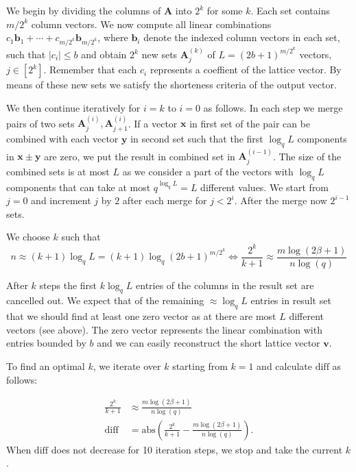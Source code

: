 We begin by dividing the columns of $\mathbf{A}$ into $2^k$ for some $k$. Each set contains $m/2^k$ column vectors. We now compute all linear combinations $c_1 \mathbf{b}_1 + \cdots + c_{m/2^k}\mathbf{b}_{m/2^k}$, where $\mathbf{b}_i$ denote the indexed column vectors in each set, such that $|c_i| \leq b$ and obtain $2^k$ new sets $\mathbf{A}_j^{(k)}$ of $L=(2b+1)^{m/2^k}$ vectors, $j\in \left[2^k\right]$. Remember that each $c_i$ represents a coeffient of the lattice vector. By means of these new sets we satisfy the shorteness criteria of the output vector.

We then continue iteratively for $i=k$ to $i=0$ as follows. In each step we merge pairs of two sets $\mathbf{A}_j^{(i)}, \mathbf{A}_{j+1}^{(i)}$. If a vector $\mathbf{x}$ in first set of the pair can be combined with each vector $\mathbf{y}$ in second set such that the first $\log_q L$ components in $\mathbf{x} \pm \mathbf{y}$ are zero, we put the result in combined set in $\mathbf{A}_j^{(i-1)}$. The size of the combined sets is at most $L$ as we consider a part of the vectors with $\log_q L$ components that can take at most $q^{\log_q L} = L$ different values. We start from $j=0$ and increment $j$ by $2$ after each merge for $j<2^i$.
After the merge now $2^{i-1}$ sets.

We choose $k$ such that
\begin{equation}
  n \approx (k+1) \log_q L = (k+1) \log_q (2b+1)^{m/2^k} \iff \frac{2^k}{k+1} \approx \frac{m \log(2\beta + 1)}{n \log(q)}
\end{equation}

After $k$ steps the first $k \log_q L$ entries of the columns in the result set are cancelled out. We expect that of the remaining $\approx \log_q L$ entries in result set that we should find at least one zero vector as at there are most $L$ different vectors (see above). The zero vector represents the linear combination with entries bounded by $b$ and we can easily reconstruct the short lattice vector $\mathbf{v}$.

To find an optimal $k$, we iterate over $k$ starting from $k=1$ and calculate $\text{diff}$ as follows:

\begin{align}
  \frac{2^k}{k+1} & \approx \frac{m \log(2\beta + 1)}{n \log(q)}                                     \\
  \text{diff}     & = \text{abs}\left(\frac{2^k}{k+1} - \frac{m \log(2\beta + 1)}{n \log(q)}\right).
\end{align}
When $\text{diff}$ does not decrease for 10 iteration steps, we stop and take the current $k$. %

